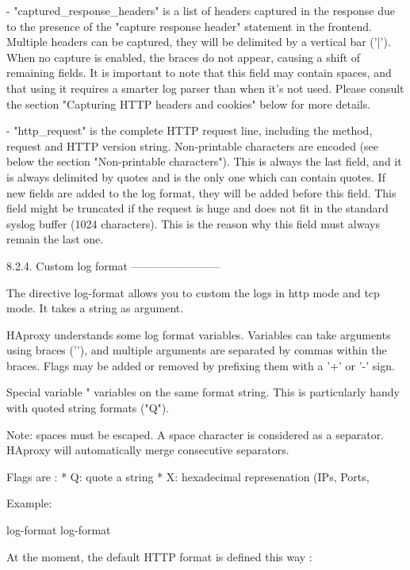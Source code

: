   - "captured_response_headers" is a list of headers captured in the response
    due to the presence of the "capture response header" statement in the
    frontend. Multiple headers can be captured, they will be delimited by a
    vertical bar ('|'). When no capture is enabled, the braces do not appear,
    causing a shift of remaining fields. It is important to note that this
    field may contain spaces, and that using it requires a smarter log parser
    than when it's not used. Please consult the section "Capturing HTTP headers
    and cookies" below for more details.

  - "http_request" is the complete HTTP request line, including the method,
    request and HTTP version string. Non-printable characters are encoded (see
    below the section "Non-printable characters"). This is always the last
    field, and it is always delimited by quotes and is the only one which can
    contain quotes. If new fields are added to the log format, they will be
    added before this field. This field might be truncated if the request is
    huge and does not fit in the standard syslog buffer (1024 characters). This
    is the reason why this field must always remain the last one.


8.2.4. Custom log format
------------------------

The directive log-format allows you to custom the logs in http mode and tcp
mode. It takes a string as argument.

HAproxy understands some log format variables. %
Variables can take arguments using braces ('{}'), and multiple arguments are
separated by commas within the braces. Flags may be added or removed by
prefixing them with a '+' or '-' sign.

Special variable "%
variables on the same format string. This is particularly handy with quoted
string formats ("Q").

Note: spaces must be escaped. A space character is considered as a separator.
HAproxy will automatically merge consecutive separators.

Flags are :
  * Q: quote a string
  * X: hexadecimal represenation (IPs, Ports, %

  Example:

    log-format %
    log-format %

At the moment, the default HTTP format is defined this way :

